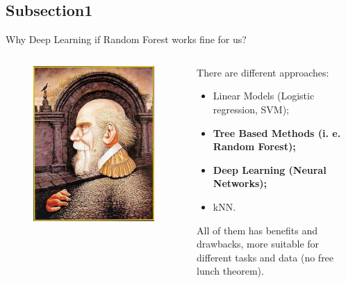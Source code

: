 \documentclass[10pt, xcolor=x11names,compress]{beamer}
\begin{document}
\subsection{Subsection1}
\begin{frame}{Why Deep Learning if Random Forest works fine for us?}
	\begin{columns}
		\begin{column}{0.45\textwidth}
			\begin{figure}
				\centering
				\includegraphics[width=\textwidth]{images/dali.jpg}
			\end{figure}
		\end{column}
		\begin{column}{0.55\textwidth}
			There are different approaches:
			\begin{itemize}
				\item Linear Models (Logistic regression, SVM);
				\item \textbf{Tree Based Methods (i. e. Random Forest);}
				\item \textbf{Deep Learning (Neural Networks);}
				\item kNN.
			\end{itemize}
			All of them has benefits and drawbacks, more suitable for different tasks and data (no free lunch theorem).
		\end{column}
	\end{columns}
\end{frame}
\end{document}

